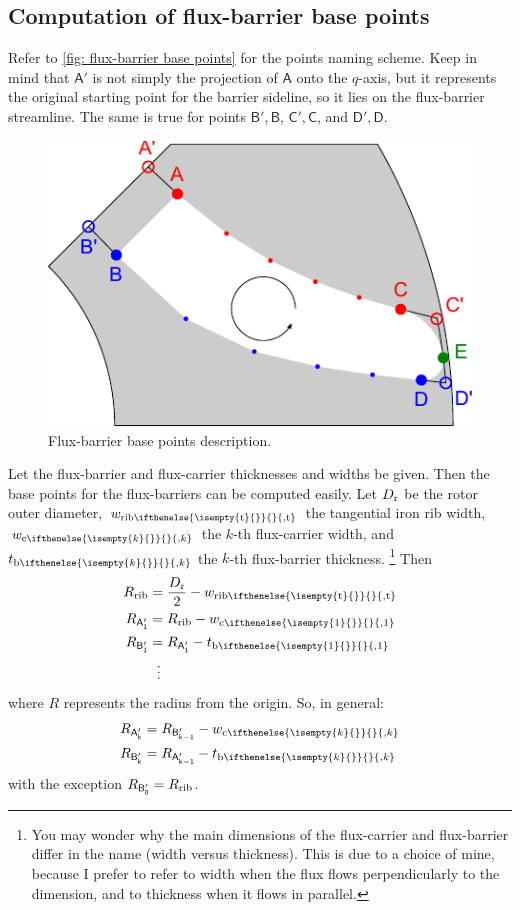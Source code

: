 \documentclass[b5paper,11pt,oneside,fleqn]{article}
\newcommand{\ped}[1]{_\textup{#1}}
\newcommand{\pt}[1]{\mathsf{#1}}
\newcommand{\wc}[1][]{%
w_{\textup{c}
\ifthenelse{\isempty{#1}{}}{}{,#1}%
}}
\newcommand{\tb}[1][]{%
t_{\textup{b}
\ifthenelse{\isempty{#1}{}}{}{,#1}%
}}
\newcommand{\wrib}[1][]{%
w_{\textup{rib}
\ifthenelse{\isempty{#1}{}}{}{,#1}%
}}
\newcommand{\wribt}{\wrib[\text{t}]}
\newcommand{\xth}[1]{$ #1 $-th}
\begin{document}
\subsection{Computation of flux-barrier base points}

Refer to \autoref{fig: flux-barrier base points} for the points naming scheme.
Keep in mind that $ \pt{A}' $ is not simply the projection of $ \pt{A} $ onto 
the $ q $-axis, but it represents the original starting point for the barrier 
sideline, so it lies on the flux-barrier streamline. The same is true for 
points
$ \pt{B}',\pt{B} $, 
$ \pt{C}',\pt{C} $, and
$ \pt{D}',\pt{D} $.

\begin{figure}[tb]
\centering
\includegraphics[width=0.75\linewidth]{gfx/BarrierPoints/BarrierPoints}
\caption{Flux-barrier base points description.}
\label{fig: flux-barrier base points}
\end{figure}

Let the flux-barrier and flux-carrier thicknesses and widths be given.
Then the base points for the flux-barriers can be computed easily.
Let
$ D\ped{r} $ be the rotor outer diameter,
$ \wribt $ the tangential iron rib width,
$ \wc[k] $ the \xth{k} flux-carrier width,
and $ \tb[k] $ the \xth{k} flux-barrier thickness.%
\footnote{%
You may wonder why the main dimensions of the flux-carrier and
flux-barrier differ in the name (width versus thickness).
This is due to a choice of mine,
because I prefer to refer to width when the flux flows perpendicularly to the
dimension,
and to thickness when it flows in parallel.%
}
%
Then
\begin{equation}
\begin{aligned}
R\ped{rib} &= \frac{D\ped{r}}{2} - \wribt \\
R_\pt{A_1'} &= R\ped{rib} - \wc[1] \\
R_\pt{B_1'} &= R_\pt{A_1'} - \tb[1] \\
    &\:\:\,\vdots
\end{aligned}
\end{equation}
where $ R $ represents the radius from the origin.
%
So, in general:
\begin{equation}
\begin{aligned}
R_\pt{A_k'} &= R_\pt{B_{k-1}'} - \wc[k] \\
R_\pt{B_k'} &= R_\pt{A_{k-1}'} - \tb[k]
\end{aligned}
\end{equation}
with the exception $ R_\pt{B_0'} = R\ped{rib} $.
\end{document}
